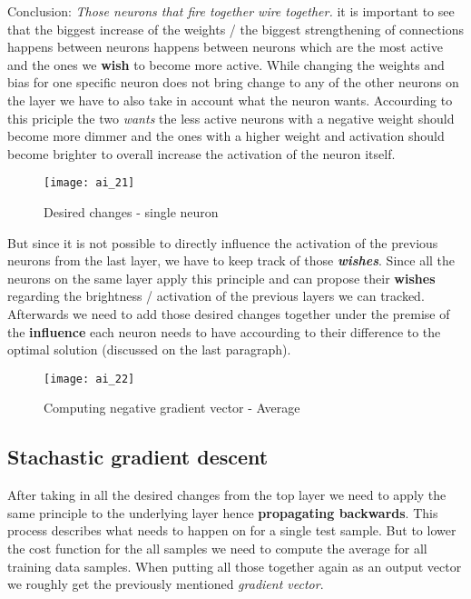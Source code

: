 \documentclass{article}
\begin{document}
Conclusion: \textit{Those neurons that fire together wire together.} it is important to see that the biggest increase of the weights / the biggest strengthening of connections happens between neurons happens between neurons which are the most active and the ones we \textbf{wish} to become more active. While changing the weights and bias for one specific neuron does not bring change to any of the other neurons on the layer we have to also take in account what the neuron wants. Accourding to this priciple the two \textit{wants} the less active neurons with a negative weight should become more dimmer and the ones with a higher weight and activation should become brighter to overall increase the activation of the neuron itself. 

\begin{figure}[!htbp]
	\centering
	\texttt{[image: ai\_21]}
	\caption{Desired changes - single neuron}
	\label{ai_21}
\end{figure}

But since it is not possible to directly influence the activation of the previous neurons from the last layer, we have to keep track of those \textbf{\textit{wishes}}. Since all the neurons on the same layer apply this principle and can propose their \textbf{wishes} regarding the brightness / activation of the previous layers we can tracked. Afterwards we need to add those desired changes together under the premise of the \textbf{influence} each neuron needs to have accourding to their difference to the optimal solution (discussed on the last paragraph). 

\begin{figure}[H]
	\centering
	\texttt{[image: ai\_22]}
	\caption{Computing negative gradient vector - Average}
	\label{ai_22}
\end{figure}



\subsection{Stachastic gradient descent}

After taking in all the desired changes from the top layer we need to apply the same principle to the underlying layer hence \textbf{propagating backwards}. This process describes what needs to happen on for a single test sample. But to lower the cost function for the all samples we need to compute the average for all training data samples. When putting all those together again as an output vector we roughly get the previously mentioned \textit{gradient vector}.
\end{document}
